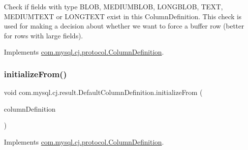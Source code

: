 Check if fields with type B\+L\+OB, M\+E\+D\+I\+U\+M\+B\+L\+OB, L\+O\+N\+G\+B\+L\+OB, T\+E\+XT, M\+E\+D\+I\+U\+M\+T\+E\+XT or L\+O\+N\+G\+T\+E\+XT exist in this Column\+Definition. This check is used for making a decision about whether we want to force a buffer row (better for rows with large fields). 

Implements \mbox{\hyperlink{interfacecom_1_1mysql_1_1cj_1_1protocol_1_1_column_definition_adc02edd67e54d79c7f91d41d027e44ae}{com.\+mysql.\+cj.\+protocol.\+Column\+Definition}}.

\mbox{\label{classcom_1_1mysql_1_1cj_1_1result_1_1_default_column_definition_a3f43ae53d1b938644d8c737c2ab07940}} 
\subsubsection{\texorpdfstring{initialize\+From()}{initializeFrom()}}
{\footnotesize\ttfamily void com.\+mysql.\+cj.\+result.\+Default\+Column\+Definition.\+initialize\+From (\begin{DoxyParamCaption}\item[{\mbox{\hyperlink{interfacecom_1_1mysql_1_1cj_1_1protocol_1_1_column_definition}{Column\+Definition}}}]{column\+Definition }\end{DoxyParamCaption})}



Implements \mbox{\hyperlink{interfacecom_1_1mysql_1_1cj_1_1protocol_1_1_column_definition_a3acff373088009fd3c2653b01cf0f7fe}{com.\+mysql.\+cj.\+protocol.\+Column\+Definition}}.

\mbox{\label{classcom_1_1mysql_1_1cj_1_1result_1_1_default_column_definition_acf4c5671472b2d95e2ca7e8600a58999}} 
